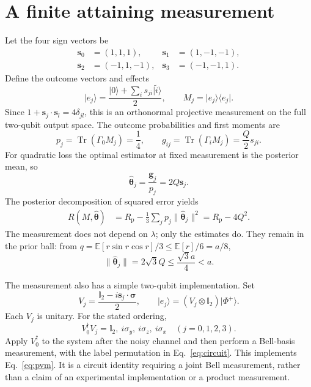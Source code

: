 \documentclass[aps,pra,reprint,amsmath,amssymb,nofootinbib,longbibliography,floatfix]{revtex4-2}
\newcommand{\ket}[1]{\lvert #1\rangle}
\newcommand{\bra}[1]{\langle #1\rvert}
\newcommand{\Tr}{\operatorname{Tr}}
\newcommand{\I}{\mathbb{I}}
\newcommand{\est}{\hat{\bm{\theta}}}
\begin{document}
\section{A finite attaining measurement}
Let the four sign vectors be
\begin{equation}
 \begin{aligned}
 \bm s_0&=(1,1,1),&\bm s_1&=(1,-1,-1),\\
 \bm s_2&=(-1,1,-1),&\bm s_3&=(-1,-1,1).
 \end{aligned}
\end{equation}
Define the outcome vectors and effects
\begin{equation}
 \ket{e_j}=\frac{\ket0+\sum_i s_{ji}\ket{\widetilde i}}{2},\qquad
 M_j=\ket{e_j}\bra{e_j}.
 \label{eq:pvm}
\end{equation}
Since $1+\bm s_j\cdot\bm s_l=4\delta_{jl}$, this is an orthonormal
projective measurement on the full two-qubit output space. The outcome
probabilities and first moments are
\begin{equation}
 p_j=\Tr(\Gamma_0M_j)=\frac14,\qquad
 g_{ij}=\Tr(\Gamma_iM_j)=\frac Q2s_{ji}.
\end{equation}
For quadratic loss the optimal estimator at fixed measurement is the
posterior mean, so
\begin{equation}
 \est_j=\frac{\bm g_j}{p_j}=2Q\bm s_j.
 \label{eq:est}
\end{equation}
The posterior decomposition of squared error yields
\begin{align}
 R(M,\est)&=R_{\mathrm p}-\frac13\sum_jp_j\|\est_j\|^2
                =R_{\mathrm p}-4Q^2.\label{eq:achieved}
\end{align}
The measurement does not depend on $\lambda$; only the estimates do.
They remain in the prior ball: from
$q=\mathbb E[r\sin r\cos r]/3\leq\mathbb E[r]/6=a/8$,
\begin{equation}
 \|\est_j\|=2\sqrt3Q\leq\frac{\sqrt3a}{4}<a.
\end{equation}

The measurement also has a simple two-qubit implementation. Set
\begin{equation}
 V_j=\frac{\I_2-i\bm s_j\cdot\bm\sigma}{2},\qquad
 \ket{e_j}=(V_j\otimes\I_2)\ket{\Phi^+}.
 \label{eq:V}
\end{equation}
Each $V_j$ is unitary. For the stated ordering,
\begin{equation}
 V_0^\dagger V_j=\I_2,\ i\sigma_y,\ i\sigma_z,\ i\sigma_x
 \quad (j=0,1,2,3).
 \label{eq:circuit}
\end{equation}
Apply $V_0^\dagger$ to the system after the noisy channel and then perform
a Bell-basis measurement, with the label permutation in
Eq.~\eqref{eq:circuit}. This implements Eq.~\eqref{eq:pvm}.
It is a circuit identity requiring a joint Bell measurement, rather
than a claim of an experimental implementation or a product measurement.
\end{document}
